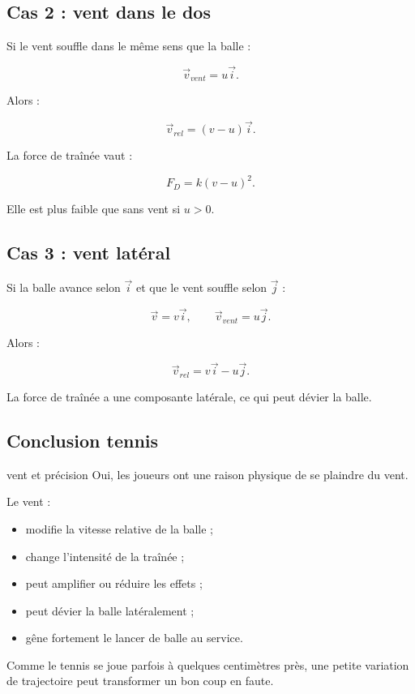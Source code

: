 \documentclass[11pt,a4paper]{article}
\begin{document}
\subsection{Cas 2 : vent dans le dos}

Si le vent souffle dans le même sens que la balle :

\[
\vec{v}_{vent}=u\vec{i}.
\]

Alors :

\[
\vec{v}_{rel}=(v-u)\vec{i}.
\]

La force de traînée vaut :

\[
F_D=k(v-u)^2.
\]

Elle est plus faible que sans vent si $u>0$.

\subsection{Cas 3 : vent latéral}

Si la balle avance selon $\vec{i}$ et que le vent souffle selon $\vec{j}$ :

\[
\vec{v}=v\vec{i},
\qquad
\vec{v}_{vent}=u\vec{j}.
\]

Alors :

\[
\vec{v}_{rel}=v\vec{i}-u\vec{j}.
\]

La force de traînée a une composante latérale, ce qui peut dévier la balle.

\subsection{Conclusion tennis}

\begin{tennis}{vent et précision}
Oui, les joueurs ont une raison physique de se plaindre du vent.

Le vent :
\begin{itemize}
    \item modifie la vitesse relative de la balle ;
    \item change l'intensité de la traînée ;
    \item peut amplifier ou réduire les effets ;
    \item peut dévier la balle latéralement ;
    \item gêne fortement le lancer de balle au service.
\end{itemize}

Comme le tennis se joue parfois à quelques centimètres près, une petite variation de trajectoire peut transformer un bon coup en faute.
\end{tennis}
\end{document}
